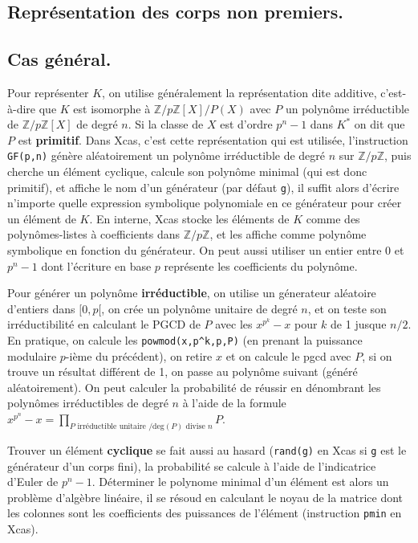 \documentclass[a4paper,11pt]{book}
\begin{document}
\begin{giacjshere}
\section{Repr\'esentation des corps non premiers.}
\subsection{Cas g\'en\'eral.}
Pour repr\'esenter $K$, on utilise g\'en\'eralement la
repr\'esentation dite additive, c'est-\`a-dire que $K$
est isomorphe \`a $\mathbb{Z}/p\mathbb{Z}[X]/P(X)$ avec $P$ un polyn\^ome
irr\'eductible de $\mathbb{Z}/p\mathbb{Z}[X]$ de degr\'e $n$. Si la classe de $X$
est d'ordre $p^n-1$ dans $K^*$ on dit que $P$ est {\bf primitif}.
Dans Xcas, c'est cette repr\'esentation qui est utilis\'ee,
l'instruction \verb|GF(p,n)| g\'en\`ere al\'eatoirement
un polyn\^ome irr\'eductible de degr\'e $n$ sur $\mathbb{Z}/p\mathbb{Z}$,
puis cherche un \'el\'ement cyclique, calcule son polyn\^ome
minimal (qui est donc primitif), et affiche le nom d'un
g\'en\'erateur (par d\'efaut \verb|g|), 
il suffit alors d'\'ecrire n'importe quelle
expression symbolique polynomiale en ce g\'en\'erateur
pour cr\'eer un \'el\'ement de $K$. En interne, Xcas stocke
les \'el\'ements de $K$ comme des polyn\^omes-listes
\`a coefficients dans $\mathbb{Z}/p\mathbb{Z}$, et les affiche comme polyn\^ome
symbolique en fonction du g\'en\'erateur. On peut aussi
utiliser un entier entre 0 et $p^n-1$ dont l'\'ecriture en base
$p$ repr\'esente les coefficients du polyn\^ome.

Pour g\'en\'erer un polyn\^ome {\bf irr\'eductible}, on utilise
un g\'enerateur al\'eatoire d'entiers dans $[0,p[$,
on cr\'ee un polyn\^ome unitaire de degr\'e $n$, et
on teste son irr\'eductibilit\'e en calculant le PGCD
de $P$ avec les $x^{p^k}-x$ pour $k$ de 1 jusque $n/2$.
En pratique, on calcule les \verb|powmod(x,p^k,p,P)|
(en prenant la puissance modulaire $p$-i\`eme
du pr\'ec\'edent), on retire $x$ et on calcule le pgcd avec $P$,
si on trouve un r\'esultat diff\'erent de 1, on passe au polyn\^ome
suivant (g\'en\'er\'e al\'eatoirement).
On peut calculer la probabilit\'e de r\'eussir en d\'enombrant
les polyn\^omes irr\'eductibles de degr\'e $n$ \`a l'aide
de la formule $x^{p^n}-x=\prod_{P \mbox{ irréductible unitaire }/ \mbox{deg}(P)\mbox{ divise } n} P$.

Trouver un \'el\'ement {\bf cyclique} se fait aussi au hasard
(\verb|rand(g)| en Xcas si \verb|g| est le g\'en\'erateur
d'un corps fini), la
probabilit\'e se calcule \`a l'aide de l'indicatrice d'Euler de
$p^n-1$. D\'eterminer le polynome minimal d'un \'el\'ement
est alors un probl\`eme d'alg\`ebre lin\'eaire, il se r\'esoud
en calculant le noyau de la matrice dont les colonnes sont
les coefficients des puissances de l'\'el\'ement (instruction
\verb|pmin| en Xcas).


\end{giacjshere}
\end{document}
